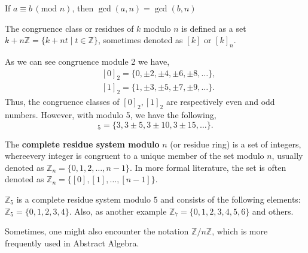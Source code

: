 \documentclass[../lecture-notes-148x210.tex]{subfiles}
\begin{document}
\begin{lemma}
    If $a \equiv b \, (\text{mod } n)$, then $\gcd(a, n) = \gcd(b, n)$
\end{lemma}

\begin{definition}
    The congruence class or residues of $k$ modulo $n$ is defined as a set 
    $k + n\mathbb{Z} = \{ k + nt \mid t \in \mathbb{Z}\}$, sometimes denoted as $[k]$ or $[k]_n$.
\end{definition}

\begin{example}
    As we can see congruence module 2 we have, 
    \begin{equation*}
        \begin{aligned}
        &[0]_2 = \{0, \pm 2, \pm 4, \pm 6, \pm 8, \ldots \}, \\
        &[1]_2 = \{1, \pm 3, \pm 5, \pm 7, \pm 9, \ldots \}.
        \end{aligned}
    \end{equation*}
    Thus, the congruence classes of $[0]_2, [1]_2$ are respectively even and odd numbers.
    However, with modulo 5, we have the following,
    \begin{equation*}
        [3]_5 = \{3, 3 \pm 5, 3 \pm 10, 3 \pm 15, \ldots \}.
    \end{equation*}
\end{example}

\begin{definition}
    The \textbf{complete residue system modulo} $n$ (or residue ring) is a set of integers, 
    whereevery integer is congruent to a unique member of the set modulo $n$, usually 
    denoted as $\mathbb{Z}_n = \{0, 1, 2, \dots, n-1\}$. 
    In more formal literature, the set is often denoted as $\mathbb{Z}_n = \{ [0], [1], \ldots, [n-1] \}$.
\end{definition}

\begin{example}
    $\mathbb{Z}_{5}$ is a complete residue system modulo $5$ and consists of the following elements: $\mathbb{Z}_5 = \{0, 1, 2, 3, 4\}$.
    Also, as another example $\mathbb{Z}_{7} = \{0, 1, 2, 3, 4, 5, 6\}$ and others.
\end{example}

\begin{remark}
    Sometimes, one might also encounter the notation $\mathbb{Z}/n\mathbb{Z}$, which is more frequently used in Abstract Algebra.
\end{remark}
\end{document}
